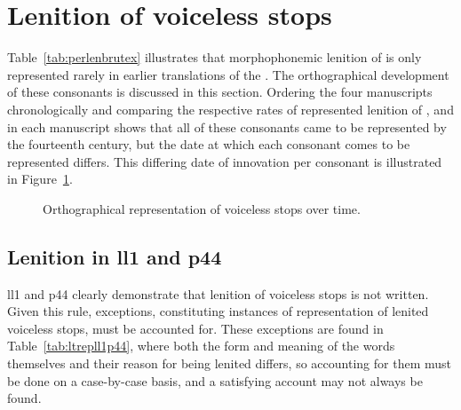 \section{Lenition of voiceless stops}
\label{sec:lenit-voic-stops}

Table~\ref{tab:perlenbrutex} illustrates that   morphophonemic lenition of  is only represented rarely in  earlier translations of the . The orthographical development of these consonants is discussed in this section. Ordering the four manuscripts  chronologically and comparing the respective rates of represented lenition of , and  in each manuscript shows that all of these consonants came to be represented by the fourteenth century, but the date at which each consonant comes to be represented differs. This differing date of innovation per consonant is illustrated in Figure~\ref{fig:linechartbrut}.  

\begin{figure}[h]
  \centering
  \caption{Orthographical representation of voiceless stops over time.}
  \label{fig:linechartbrut}
\end{figure}

\subsection{Lenition in \acrshort{ll1} and \acrshort{p44}}
\label{sec:lenit-acrsh-acrsh}
\Gls{ll1} and \gls{p44} clearly demonstrate that lenition of voiceless stops is not written.
Given this rule, exceptions, constituting instances of representation of lenited voiceless stops, must be accounted for.
These exceptions are found in Table~\ref{tab:ltrepll1p44}, where both the form and meaning of the words themselves and their reason for being lenited differs, so accounting for them must be done on a case-by-case basis, and a satisfying account may not always be found.

